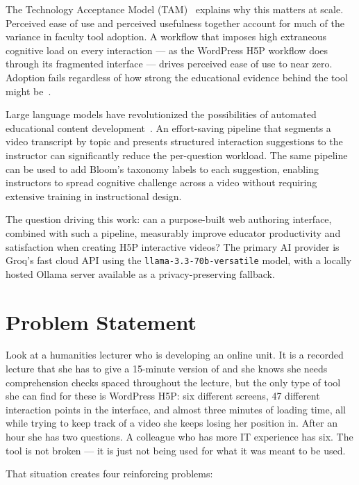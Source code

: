 The Technology Acceptance Model (TAM)~\cite{davis1989} explains why this matters at scale. Perceived ease of use and perceived usefulness together account for much of the variance in faculty tool adoption. A workflow that imposes high extraneous cognitive load on every interaction --- as the WordPress H5P workflow does through its fragmented interface --- drives perceived ease of use to near zero. Adoption fails regardless of how strong the educational evidence behind the tool might be~\cite{sweller1988,chandler1991}.

Large language models have revolutionized the possibilities of automated educational content development~\cite{brown2020,anthropic2024}. An effort-saving pipeline that segments a video transcript by topic and presents structured interaction suggestions to the instructor can significantly reduce the per-question workload. The same pipeline can be used to add Bloom's taxonomy labels to each suggestion, enabling instructors to spread cognitive challenge across a video without requiring extensive training in instructional design.

The question driving this work: can a purpose-built web authoring interface, combined with such a pipeline, measurably improve educator productivity and satisfaction when creating H5P interactive videos? The primary AI provider is Groq's fast cloud API using the \texttt{llama-3.3-70b-versatile} model, with a locally hosted Ollama server available as a privacy-preserving fallback.

\section{Problem Statement}

Look at a humanities lecturer who is developing an online unit. It is a recorded lecture that she has to give a 15-minute version of and she knows she needs comprehension checks spaced throughout the lecture, but the only type of tool she can find for these is WordPress H5P: six different screens, 47 different interaction points in the interface, and almost three minutes of loading time, all while trying to keep track of a video she keeps losing her position in. After an hour she has two questions. A colleague who has more IT experience has six. The tool is not broken --- it is just not being used for what it was meant to be used.

That situation creates four reinforcing problems:

